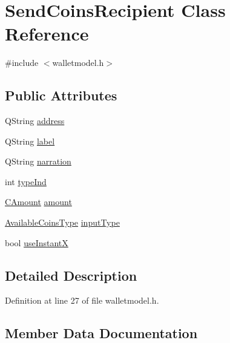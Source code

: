 \hypertarget{class_send_coins_recipient}{}\section{Send\+Coins\+Recipient Class Reference}
\label{class_send_coins_recipient}


{\ttfamily \#include $<$walletmodel.\+h$>$}

\subsection*{Public Attributes}
\begin{DoxyCompactItemize}
\item 
Q\+String \hyperlink{class_send_coins_recipient_aaa8a3b13ff9f8e84baced2aec75307a0}{address}
\item 
Q\+String \hyperlink{class_send_coins_recipient_a0152933f2c0cb9164d2fcb36bca83666}{label}
\item 
Q\+String \hyperlink{class_send_coins_recipient_a3b07492ab64678b45cc5b44cea1090ca}{narration}
\item 
int \hyperlink{class_send_coins_recipient_aa7f64542aa7cfe5cfc4fe62a8488eb7e}{type\+Ind}
\item 
\hyperlink{amount_8h_a4eaf3a5239714d8c45b851527f7cb564}{C\+Amount} \hyperlink{class_send_coins_recipient_a54ab1355617a342b9b3d7f6e0781f578}{amount}
\item 
\hyperlink{wallet_8h_a90b09b05f289ac32704a6446a94566ce}{Available\+Coins\+Type} \hyperlink{class_send_coins_recipient_a92cb8e99cd0a80c5f972955338a8a0f5}{input\+Type}
\item 
bool \hyperlink{class_send_coins_recipient_a1fc33af0a7bde812bcd03c0cdf514bd1}{use\+Instant\+X}
\end{DoxyCompactItemize}


\subsection{Detailed Description}


Definition at line 27 of file walletmodel.\+h.



\subsection{Member Data Documentation}
\hypertarget{class_send_coins_recipient_aaa8a3b13ff9f8e84baced2aec75307a0}{}
